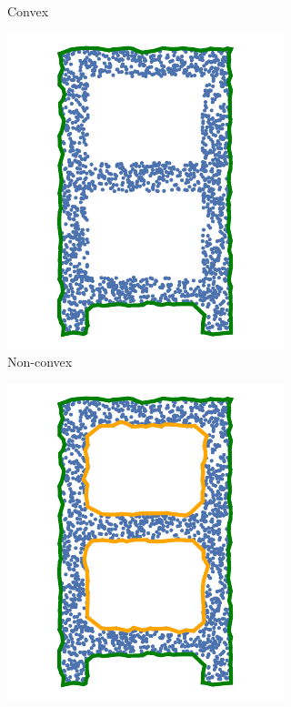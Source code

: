 \begin{figure}[H]
\begin{subfigure}{.24\linewidth}
    \caption{\label{fig:ch3_convex_concave_2}Convex}\vspace{6pt}
  \end{subfigure}
  \begin{subfigure}{.24\linewidth}
    \centering\includegraphics[width=.8\linewidth]{chapter_3_polylidar3d/imgs/concave_vs_convex_lettera_2.pdf}
    \caption{\label{fig:ch3_convex_concave_3}Non-convex}\vspace{6pt}
  \end{subfigure}
  \begin{subfigure}{.24\linewidth}
    \centering\includegraphics[width=.8\linewidth]{chapter_3_polylidar3d/imgs/concave_vs_convex_lettera_3.pdf}

\end{subfigure}
\end{figure}
